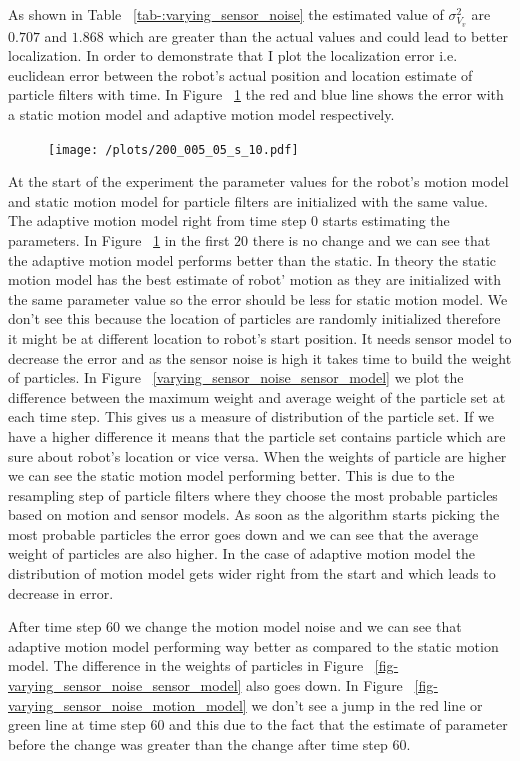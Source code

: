 \documentclass[12pt,draft]{dalcsthesis}
\begin{document}
As shown in Table ~\ref{tab-:varying_sensor_noise} the estimated value of $\sigma_{V_{v}}^2$ are $0.707$ and $1.868$ which are greater than the actual values and could lead to better localization. In order to demonstrate that I plot the localization error i.e. euclidean error between the robot's actual position and location estimate of particle filters with time. In Figure ~\ref{fig-varying_sensor_noise} the red and blue line shows the error with a static motion model and adaptive motion model respectively.

 
 
\begin{figure}
  \centering
     {\texttt{[image: /plots/200\_005\_05\_s\_10.pdf]}}
  \caption{\label{fig-varying_sensor_noise} }
\end{figure}
At the start of the experiment the parameter values for the robot's motion model and static motion model for particle filters are initialized with the same value. The adaptive motion model right from time step 0 starts estimating the parameters. In Figure ~\ref{fig-varying_sensor_noise} in the first $20$ there is no change and we can see that the adaptive motion model performs better than the static. In theory the static motion model has the best estimate of robot' motion as they are initialized with the same parameter value so the error should be less for static motion model. We don't see this because the location of particles are randomly initialized therefore it might be at different location to robot's start position. It needs sensor model to decrease the error and as the sensor noise is high it takes time to build the weight of particles. In Figure ~\ref{varying_sensor_noise_sensor_model} we plot the difference between the maximum weight and average weight of the particle set at each time step. This gives us a measure of distribution of the particle set. If we have a higher difference it means that the particle set contains particle which are sure about robot's location or vice versa. When the weights of particle are higher we can see the 
static motion model performing better. This is due to the resampling step of particle filters where they choose the most probable particles based on motion and sensor models. As soon as the algorithm starts picking the most probable particles the error goes down and we can see that the average weight of particles are also higher. In the case of adaptive motion model the distribution of motion model gets wider right from the start and which leads to decrease in error.

After time step 60 we change the motion model noise and we can see that adaptive motion model performing way better as compared to the static motion model. The difference in the weights of particles in Figure ~\ref{fig-varying_sensor_noise_sensor_model} also goes down. In Figure ~\ref{fig-varying_sensor_noise_motion_model} we don't see a jump in the red line or green line at time step 60 and this due to the fact that the estimate of parameter before the change was greater than the change after time step 60. 
\end{document}
